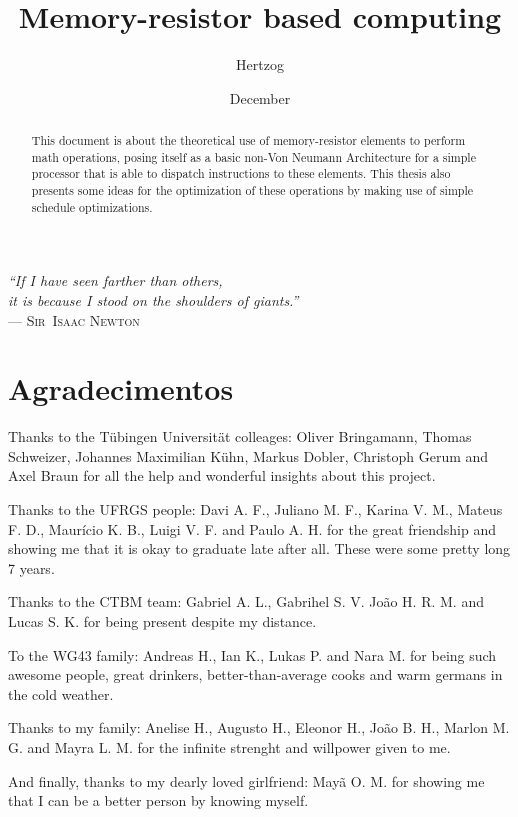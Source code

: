 \documentclass[ecp,tc,english]{iiufrgs}
\title{Memory-resistor based computing}
\author{Hertzog}{Alexandre}
\date{December}{2015}
\begin{document}
\maketitle

\clearpage
\begin{flushright}
\mbox{}\vfill
{\sffamily\itshape
``If I have seen farther than others,\\
it is because I stood on the shoulders of giants.''\\}
--- \textsc{Sir~Isaac Newton}
\end{flushright}

\chapter*{Agradecimentos}
Thanks to the Tübingen Universität colleages: Oliver Bringamann, Thomas Schweizer, Johannes Maximilian Kühn, Markus Dobler, Christoph Gerum and Axel Braun for all the help and wonderful insights about this project.

Thanks to the UFRGS people: Davi A. F., Juliano M. F., Karina V. M., Mateus F. D., Maurício K. B., Luigi V. F. and Paulo A. H. for the great friendship and showing me that it is okay to graduate late after all. These were some pretty long 7 years.

Thanks to the CTBM team: Gabriel A. L., Gabrihel S. V. João H. R. M. and Lucas S. K. for being present despite my distance.

To the WG43 family: Andreas H., Ian K., Lukas P. and Nara M. for being such awesome people, great drinkers, better-than-average cooks and warm germans in the cold weather.

Thanks to my family: Anelise H., Augusto H., Eleonor H., João B. H., Marlon M. G. and Mayra L. M. for the infinite strenght and willpower given to me.

And finally, thanks to my dearly loved girlfriend: Mayã O. M. for showing me that I can be a better person by knowing myself.

\begin{abstract}
This document is about the theoretical use of memory-resistor elements to perform math operations, posing itself as a basic non-Von Neumann Architecture for a simple processor that is able to dispatch instructions to these elements. This thesis also presents some ideas for the optimization of these operations by making use of simple schedule optimizations.
\end{abstract}
\end{document}
